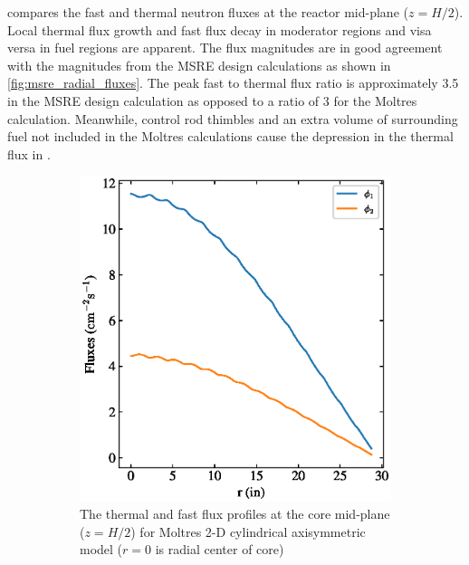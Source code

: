 \documentclass{article}
\makeatletter
\def\maxwidth#1{\ifdim\Gin@nat@width>#1 #1\else\Gin@nat@width\fi}
\makeatother
\begin{document}
 compares the fast and thermal neutron fluxes at the
reactor mid-plane ($z=H/2$). Local thermal flux growth and fast flux decay in
moderator regions and visa versa in fuel regions are apparent. The flux
magnitudes are in good agreement with the magnitudes from the \gls{MSRE} design
calculations \cite[p. 92]{briggs_molten-salt_1964} as shown in
\cref{fig:msre_radial_fluxes}. The peak fast to thermal flux ratio is
approximately 3.5 in the \gls{MSRE} design calculation as opposed to a ratio of
3 for the Moltres calculation. Meanwhile, control rod thimbles and
an extra volume of surrounding fuel not included in the Moltres calculations
cause the depression in the thermal flux in .

\begin{figure}[htpb]
    \centering
    \begin{subfigure}[b]{.5\textwidth}
      \includegraphics[width=\maxwidth{\textwidth}]{moltres_radial_fluxes.eps}
      \caption{The thermal and fast flux profiles at the core mid-plane
        ($z=H/2$) for Moltres 2-D cylindrical axisymmetric model ($r=0$ is radial center
        of core)}
      \label{fig:moltres_radial_fluxes}
    \end{subfigure}
    \begin{subfigure}[b]{.5\textwidth}

\end{subfigure}
\end{figure}
\end{document}
